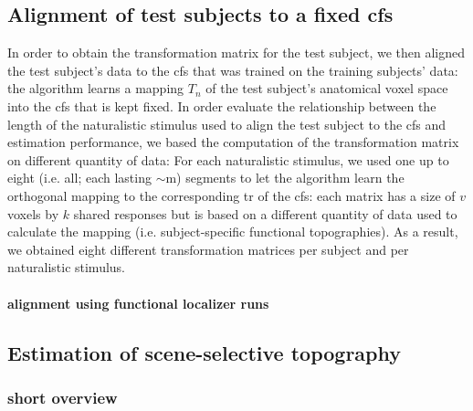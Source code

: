 \subsection{Alignment of test subjects to a fixed \ac{cfs}}



%
In order to obtain the transformation matrix for the test subject, we then
aligned the test subject's data to the \ac{cfs} that was trained on the training
subjects' data:
%
the algorithm learns a mapping $T_{n}$ of the test subject's anatomical voxel
space into the \ac{cfs} that is kept fixed.
%
In order evaluate the relationship between the length of the naturalistic
stimulus used to align the test subject to the \ac{cfs} and estimation
performance, we based the computation of the transformation matrix on different
quantity of data:
%
For each naturalistic stimulus, we used one up to eight (i.e. all; each lasting
$\sim$\unit[15]{m}) segments to let the algorithm learn the orthogonal mapping
to the corresponding \acs{tr} of the \ac{cfs}:
%
each matrix has a size of $v$ voxels by $k$ shared responses but is based on a
different quantity of data used to calculate the mapping (i.e.  subject-specific
functional topographies).
%
As a result, we obtained eight different transformation matrices per subject and
per naturalistic stimulus.


\paragraph{alignment using functional localizer runs}




\subsection{Estimation of scene-selective topography}


\subsubsection{short overview}

